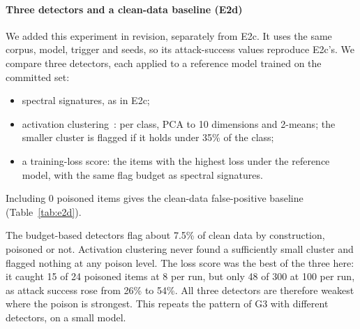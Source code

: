 \paragraph{Three detectors and a clean-data baseline (E2d)}
We added this experiment in revision, separately from E2c. It uses the same corpus, model,
trigger and seeds, so its attack-success values reproduce E2c's. We compare three detectors,
each applied to a reference model trained on the committed set:
\begin{itemize}
\item spectral signatures, as in E2c;
\item activation clustering~\cite{chen2019activation}: per class, PCA to 10 dimensions and
  2-means; the smaller cluster is flagged if it holds under 35\% of the class;
\item a training-loss score: the items with the highest loss under the reference model, with
  the same flag budget as spectral signatures.
\end{itemize}
Including 0 poisoned items gives the clean-data false-positive baseline (Table~\ref{tab:e2d}).

The budget-based detectors flag about 7.5\% of clean data by construction, poisoned or not.
Activation clustering never found a sufficiently small cluster and flagged nothing at any
poison level. The loss score was the best of the three here: it caught 15 of 24 poisoned
items at 8 per run, but only 48 of 300 at 100 per run, as attack success rose from 26\% to
54\%. All three detectors are therefore weakest where the poison is strongest. This repeats
the pattern of G3 with different detectors, on a small model.

\begin{table}[t]
\centering\scriptsize
\caption{E2d: three detectors on the prototype, authorised-source poison (3 seeds per row).
Recall as poisoned items flagged out of all poisoned items over the 3 runs; FP: clean items
flagged, mean per run (rate over 1,500 clean items). Attack success: mean, $n=100$ triggered
reviews per run.}\label{tab:e2d}
\end{table}

